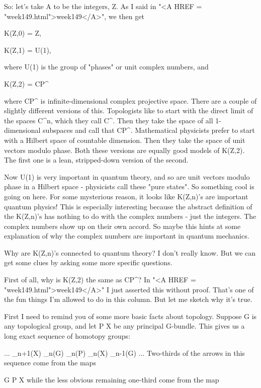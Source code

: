 So: let's take A to be the integers, Z.  As I said in "<A HREF = "week149.html">week149</A>",
we then get

K(Z,0) = Z,

K(Z,1) = U(1),

where U(1) is the group of "phases" or unit complex numbers, and

K(Z,2) = CP^{\infty }

where CP^{\infty } is infinite-dimensional complex projective space.
There are a couple of slightly different versions of this.  Topologists
like to start with the direct limit of the spaces C^{n}, which they call
C^{\infty }.  Then they take the space of all 1-dimensional 
subspaces and
call that CP^{\infty }.  Mathematical physicists prefer to start with a
Hilbert space of countable dimension.  Then they take the space of unit
vectors modulo phase.  Both these versions are equally good models of
K(Z,2).  The first one is a lean, stripped-down version of the second.

Now U(1) is very important in quantum theory, and so are unit vectors
modulo phase in a Hilbert space - physicists call these "pure states".
So something cool is going on here.  For some mysterious reason, it
looks like K(Z,n)'s are important quantum physics!  This is especially
interesting because the abstract definition of the K(Z,n)'s has nothing
to do with the complex numbers - just the integers.  The complex numbers
show up on their own accord.  So maybe this hints at some explanation of
why the complex numbers are important in quantum mechanics.

Why are K(Z,n)'s connected to quantum theory?  I don't really know. 
But we can get some clues by asking some more specific questions.  

First of all, why is K(Z,2) the same as CP^{\infty }?  In "<A HREF = "week149.html">week149</A>" I
just asserted this without proof.  That's one of the fun things I'm
allowed to do in this column.  But let me sketch why it's true.  

First I need to remind you of some more basic facts about topology.  
Suppose G is any topological group, and let P \to  X be any principal 
G-bundle.   This gives us a long exact sequence of homotopy groups:

 ... \to  \pi _{n+1}(X) \to  \pi _{n}(G) \to  \pi _{n}(P) \to  \pi _{n}(X) \to  \pi _{n-1}(G) \to  ...
Two-thirds of the arrows in this sequence come from the maps

                       G \to  P \to  X 
while the less obvious remaining one-third come from the map

